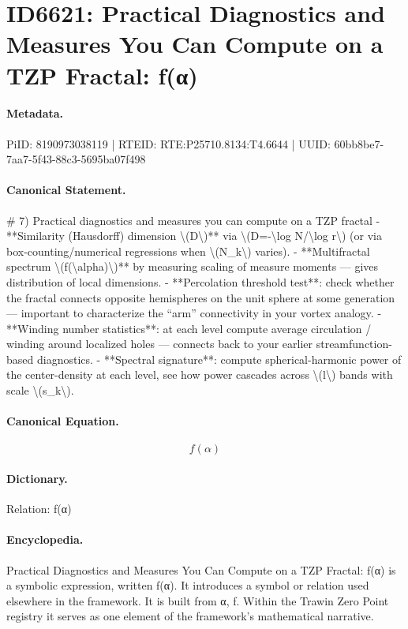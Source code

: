 \section*{ID6621: Practical Diagnostics and Measures You Can Compute on a TZP Fractal: f(α)}
\paragraph{Metadata.}
PiID: 8190973038119 | RTEID: RTE:P25710.8134:T4.6644 | UUID: 60bb8be7-7aa7-5f43-88c3-5695ba07f498

\paragraph{Canonical Statement.}
\# 7) Practical diagnostics and measures you can compute on a TZP fractal - **Similarity (Hausdorff) dimension \textbackslash{}(D\textbackslash{})** via \textbackslash{}(D=-\textbackslash{}log N/\textbackslash{}log r\textbackslash{}) (or via box-counting/numerical regressions when \textbackslash{}(N\_k\textbackslash{}) varies). - **Multifractal spectrum \textbackslash{}(f(\textbackslash{}alpha)\textbackslash{})** by measuring scaling of measure moments — gives distribution of local dimensions. - **Percolation threshold test**: check whether the fractal connects opposite hemispheres on the unit sphere at some generation — important to characterize the “arm” connectivity in your vortex analogy. - **Winding number statistics**: at each level compute average circulation / winding around localized holes — connects back to your earlier streamfunction-based diagnostics. - **Spectral signature**: compute spherical-harmonic power of the center-density at each level, see how power cascades across \textbackslash{}(l\textbackslash{}) bands with scale \textbackslash{}(s\_k\textbackslash{}).

\paragraph{Canonical Equation.}
\[
f(\alpha)
\]

\paragraph{Dictionary.}
Relation: f(α)

\paragraph{Encyclopedia.}
Practical Diagnostics and Measures You Can Compute on a TZP Fractal: f(α) is a symbolic expression, written f(α). It introduces a symbol or relation used elsewhere in the framework. It is built from α, f. Within the Trawin Zero Point registry it serves as one element of the framework's mathematical narrative.

